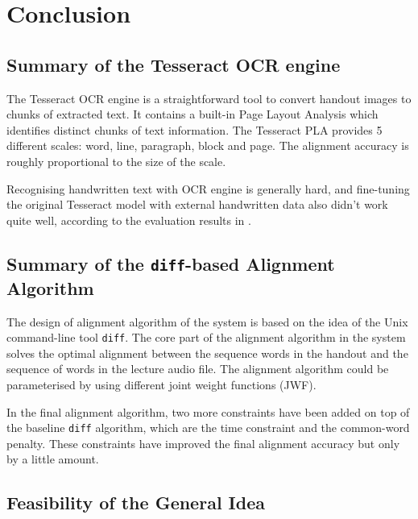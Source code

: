 
\chapter{Conclusion}
\label{chap:conclusion}

\ifpdf
    \graphicspath{{Chapter10/Figs/Raster/}{Chapter10/Figs/PDF/}{Chapter10/Figs/}}
\else
    \graphicspath{{Chapter10/Figs/Vector/}{Chapter10/Figs/}}
\fi



\section{Summary of the Tesseract OCR engine}

The Tesseract OCR engine is a straightforward tool to convert handout images to chunks of extracted text. It contains a built-in Page Layout Analysis which identifies distinct chunks of text information. The Tesseract PLA provides 5 different scales: word, line, paragraph, block and page. The alignment accuracy is roughly proportional to the size of the scale.

Recognising handwritten text with OCR engine is generally hard, and fine-tuning the original Tesseract model with external handwritten data also didn't work quite well, according to the evaluation results in . 

\section{Summary of the \texttt{diff}-based Alignment Algorithm}

The design of alignment algorithm of the system is based on the idea of the Unix command-line tool \texttt{diff}. The core part of the alignment algorithm in the system solves the optimal alignment between the sequence words in the handout and the sequence of words in the lecture audio file. The alignment algorithm could be parameterised by using different joint weight functions (JWF).

In the final alignment algorithm, two more constraints have been added on top of the baseline \texttt{diff} algorithm, which are the time constraint and the common-word penalty. These constraints have improved the final alignment accuracy but only by a little amount.


\section{Feasibility of the General Idea}


